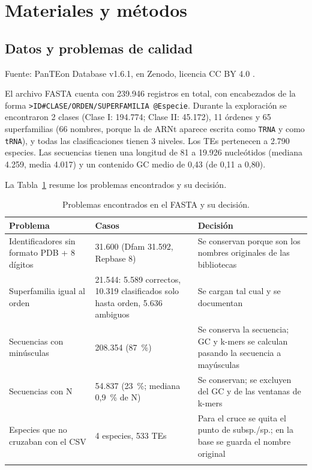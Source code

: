 \documentclass[unnumsec,namedate,webpdf,contemporary,large]{oup-authoring-template}
\begin{document}
\section{Materiales y m\'etodos}

\subsection{Datos y problemas de calidad}

Fuente: PanTEon Database v1.6.1, en Zenodo, licencia CC BY 4.0 \citep{panteon2026database}.

El archivo FASTA cuenta con 239.946 registros en total, con encabezados de la forma \texttt{>ID\#CLASE/ORDEN/SUPERFAMILIA @Especie}.
Durante la exploraci\'on se encontraron 2 clases (Clase I: 194.774; Clase II: 45.172), 11 \'ordenes y 65 superfamilias (66 nombres, porque la de ARNt aparece escrita como \texttt{TRNA} y como \texttt{tRNA}), y todas las clasificaciones tienen 3 niveles. Los TEs pertenecen a 2.790 especies. Las secuencias tienen una longitud de 81 a 19.926 nucle\'otidos (mediana 4.259, media 4.017) y un contenido GC medio de 0,43 (de 0,11 a 0,80).

La Tabla~\ref{tab:calidad_fasta} resume los problemas encontrados y su decisi\'on.

\begin{table}[!t]
\caption{Problemas encontrados en el FASTA y su decisi\'on.\label{tab:calidad_fasta}}
\footnotesize
\begin{tabular}{@{}p{}p{}p{}@{}}
\toprule
Problema & Casos & Decisi\'on \\
\midrule
Identificadores sin formato PDB + 8 d\'igitos & 31.600 (Dfam 31.592, Repbase 8) & Se conservan porque son los nombres originales de las bibliotecas \\
Superfamilia igual al orden & 21.544: 5.589 correctos, 10.319 clasificados solo hasta orden, 5.636 ambiguos & Se cargan tal cual y se documentan \\
Secuencias con min\'usculas & 208.354 (87~\%) & Se conserva la secuencia; GC y k-mers se calculan pasando la secuencia a may\'usculas \\
Secuencias con N & 54.837 (23~\%; mediana 0,9~\% de N) & Se conservan; se excluyen del GC y de las ventanas de k-mers \\
Especies que no cruzaban con el CSV & 4 especies, 533 TEs & Para el cruce se quita el punto de subsp./sp.; en la base se guarda el nombre original \\
\botrule
\end{tabular}
\end{table}
\end{document}
